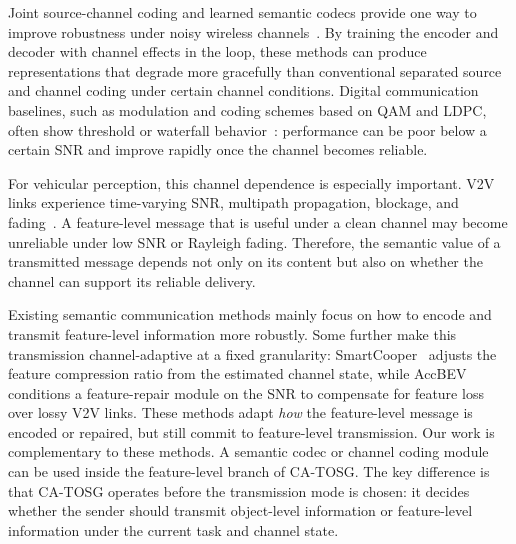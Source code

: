 \documentclass[journal]{IEEEtran}
\newcommand{\method}{CA-TOSG}
\begin{document}
Joint source-channel coding and learned semantic codecs provide one way to improve robustness under noisy wireless channels~\cite{sheng2024importance,gan2026scomcp}. By training the encoder and decoder with channel effects in the loop, these methods can produce representations that degrade more gracefully than conventional separated source and channel coding under certain channel conditions. Digital communication baselines, such as modulation and coding schemes based on QAM and LDPC, often show threshold or waterfall behavior~\cite{ieee80211bd}: performance can be poor below a certain SNR and improve rapidly once the channel becomes reliable.

For vehicular perception, this channel dependence is especially important. V2V links experience time-varying SNR, multipath propagation, blockage, and fading~\cite{ieee80211bd}. A feature-level message that is useful under a clean channel may become unreliable under low SNR or Rayleigh fading. Therefore, the semantic value of a transmitted message depends not only on its content but also on whether the channel can support its reliable delivery.

Existing semantic communication methods mainly focus on how to encode and transmit feature-level information more robustly. Some further make this transmission channel-adaptive at a fixed granularity: SmartCooper~\cite{zhang2024smartcooper} adjusts the feature compression ratio from the estimated channel state, while AccBEV~\cite{accbev2025} conditions a feature-repair module on the SNR to compensate for feature loss over lossy V2V links. These methods adapt \emph{how} the feature-level message is encoded or repaired, but still commit to feature-level transmission. Our work is complementary to these methods. A semantic codec or channel coding module can be used inside the feature-level branch of \method{}. The key difference is that \method{} operates before the transmission mode is chosen: it decides whether the sender should transmit object-level information or feature-level information under the current task and channel state.
\end{document}
